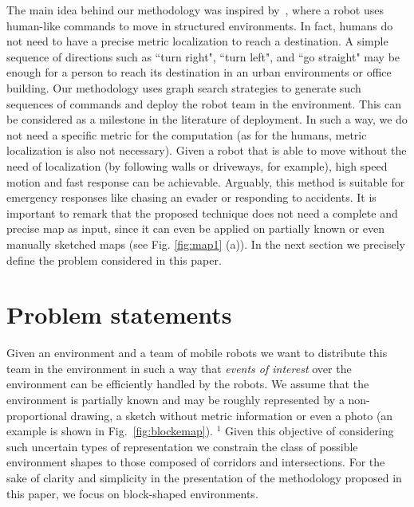 \documentclass[smallcondensed]{svjour3}
\begin{document}
%
The main idea behind our methodology was inspired by~\cite{Arthur2015}, where a robot uses human-like commands to move in structured environments. In fact, humans do not need to have a precise metric localization to reach a destination. A simple sequence of directions such as ``turn right", ``turn left", and ``go straight" may be enough for a person to reach its destination in an urban environments or office building. Our methodology uses graph search strategies to generate such sequences of commands and deploy the robot team in the environment. 
%
This can be considered as a milestone in the literature of deployment. In such a way, we do not need a specific metric for the computation (as for the humans, metric localization is also not necessary). Given a robot that is able to move without the need of localization (by following walls or driveways, for example), high speed motion and fast response can be achievable. Arguably, this method is suitable for emergency responses like chasing an evader or responding to accidents. It is important to remark that the proposed technique does not need a complete and precise map as input, since it can even be applied on partially known or even manually sketched maps (see Fig. \ref{fig:map1} (a)). 
In the next section we precisely define the problem considered in this paper.  

%
\section{Problem statements}
\label{sec:probstate}

Given an environment and a team of mobile robots we want to distribute this team in the environment in such a way that \textit{events of interest} over the environment can be efficiently handled by the robots. We assume that the environment is partially known and may be roughly represented by a non-proportional drawing, a sketch without metric information or even a photo (an example is shown in Fig.~\ref{fig:blockemap}). {\color{blue}$^1$ Given this objective of considering such uncertain types of representation we constrain the class of possible environment shapes to those composed of corridors and intersections. For the sake of clarity and simplicity in the presentation of the methodology proposed in this paper, we focus on block-shaped environments.} 
\end{document}
